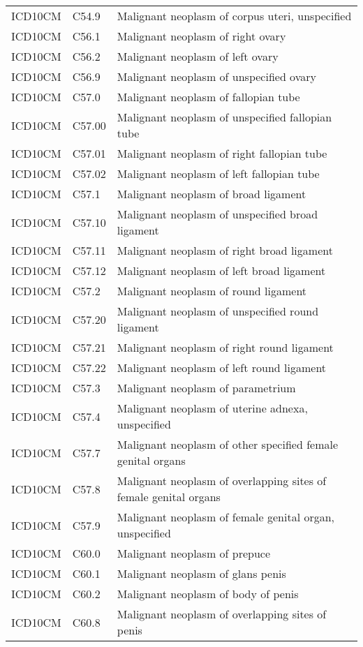 \begin{table}[ht]
\begin{tabular}{lll}
  ICD10CM & C54.9 & Malignant neoplasm of corpus uteri, unspecified \\ 
  ICD10CM & C56.1 & Malignant neoplasm of right ovary \\ 
  ICD10CM & C56.2 & Malignant neoplasm of left ovary \\ 
  ICD10CM & C56.9 & Malignant neoplasm of unspecified ovary \\ 
  ICD10CM & C57.0 & Malignant neoplasm of fallopian tube \\ 
  ICD10CM & C57.00 & Malignant neoplasm of unspecified fallopian tube \\ 
  ICD10CM & C57.01 & Malignant neoplasm of right fallopian tube \\ 
  ICD10CM & C57.02 & Malignant neoplasm of left fallopian tube \\ 
  ICD10CM & C57.1 & Malignant neoplasm of broad ligament \\ 
  ICD10CM & C57.10 & Malignant neoplasm of unspecified broad ligament \\ 
  ICD10CM & C57.11 & Malignant neoplasm of right broad ligament \\ 
  ICD10CM & C57.12 & Malignant neoplasm of left broad ligament \\ 
  ICD10CM & C57.2 & Malignant neoplasm of round ligament \\ 
  ICD10CM & C57.20 & Malignant neoplasm of unspecified round ligament \\ 
  ICD10CM & C57.21 & Malignant neoplasm of right round ligament \\ 
  ICD10CM & C57.22 & Malignant neoplasm of left round ligament \\ 
  ICD10CM & C57.3 & Malignant neoplasm of parametrium \\ 
  ICD10CM & C57.4 & Malignant neoplasm of uterine adnexa, unspecified \\ 
  ICD10CM & C57.7 & Malignant neoplasm of other specified female genital organs \\ 
  ICD10CM & C57.8 & Malignant neoplasm of overlapping sites of female genital organs \\ 
  ICD10CM & C57.9 & Malignant neoplasm of female genital organ, unspecified \\ 
  ICD10CM & C60.0 & Malignant neoplasm of prepuce \\ 
  ICD10CM & C60.1 & Malignant neoplasm of glans penis \\ 
  ICD10CM & C60.2 & Malignant neoplasm of body of penis \\ 
  ICD10CM & C60.8 & Malignant neoplasm of overlapping sites of penis \\ 

\end{tabular}
\end{table}
